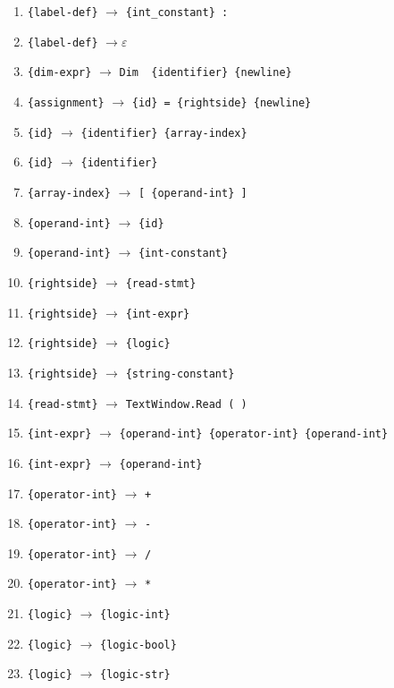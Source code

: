 \documentclass[a4paper,12pt,notitlepage,pdftex]{scrreprt}
\begin{document}
\begin{enumerate}
                \item \verb'{label-def}' $\rightarrow$ \verb'{int_constant} :'
                \item \verb'{label-def}' $\rightarrow \varepsilon$
                \item \verb'{dim-expr}' $\rightarrow$ \verb'Dim  {identifier} {newline}'
                \item \verb'{assignment}' $\rightarrow$ \verb'{id} = {rightside} {newline}'
                \item \verb'{id}' $\rightarrow$ \verb'{identifier} {array-index}'
                \item \verb'{id}' $\rightarrow$ \verb'{identifier}'
                \item \verb'{array-index}' $\rightarrow$ \verb'[ {operand-int} ]'
                \item \verb'{operand-int}' $\rightarrow$ \verb'{id}'
                \item \verb'{operand-int}' $\rightarrow$ \verb'{int-constant}'
                \item \verb'{rightside}' $\rightarrow$ \verb'{read-stmt}'
                \item \verb'{rightside}' $\rightarrow$ \verb'{int-expr}'
                \item \verb'{rightside}' $\rightarrow$ \verb'{logic}'
                \item \verb'{rightside}' $\rightarrow$ \verb'{string-constant}'
                \item \verb'{read-stmt}' $\rightarrow$ \verb'TextWindow.Read ( )'
                \item \verb'{int-expr}' $\rightarrow$ \verb'{operand-int} {operator-int} {operand-int}'
                \item \verb'{int-expr}' $\rightarrow$ \verb'{operand-int}'
                \item \verb'{operator-int}' $\rightarrow$ \verb'+'
                \item \verb'{operator-int}' $\rightarrow$ \verb'-'
                \item \verb'{operator-int}' $\rightarrow$ \verb'/'
                \item \verb'{operator-int}' $\rightarrow$ \verb'*'
                \item \verb'{logic}' $\rightarrow$ \verb'{logic-int}'
                \item \verb'{logic}' $\rightarrow$ \verb'{logic-bool}'
                \item \verb'{logic}' $\rightarrow$ \verb'{logic-str}'

\end{enumerate}
\end{document}
